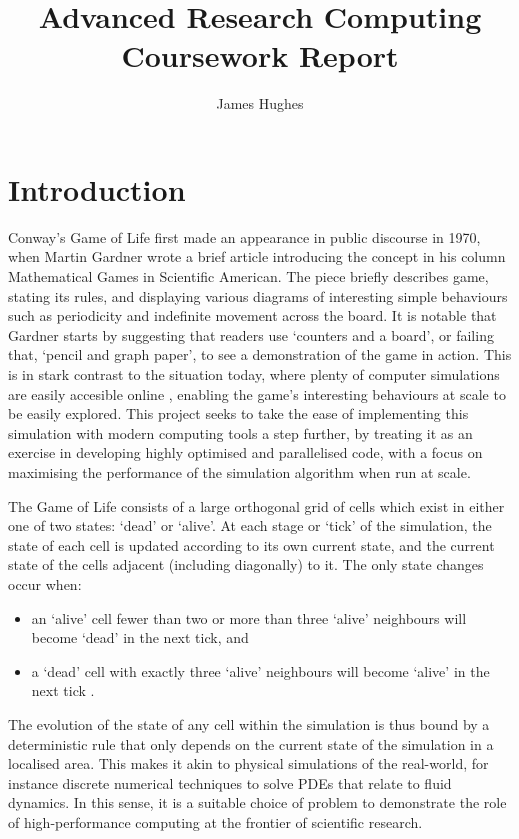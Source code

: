 \documentclass[12pt]{article}
\title{Advanced Research Computing Coursework Report}
\author{James Hughes}
\begin{document}
\maketitle

\newpage

\tableofcontents

\newpage

\section*{Introduction}

Conway's Game of Life first made an appearance in public discourse in 1970,
when Martin Gardner wrote a brief article introducing the concept in his column Mathematical Games in Scientific American\cite{gameoflife}.
The piece briefly describes game, stating its rules,
and displaying various diagrams of interesting simple behaviours such as periodicity and indefinite movement across the board.
It is notable that Gardner starts by suggesting that readers use `counters and a board', or failing that, `pencil and graph paper',
to see a demonstration of the game in action.
This is in stark contrast to the situation today, where plenty of computer simulations are easily accesible online \cite{playgameoflife},
enabling the game's interesting behaviours at scale to be easily explored.
This project seeks to take the ease of implementing this simulation with modern computing tools a step further,
by treating it as an exercise in developing highly optimised and parallelised code,
with a focus on maximising the performance of the simulation algorithm when run at scale.

The Game of Life consists of a large orthogonal grid of cells which exist in either one of two states: `dead' or `alive'.
At each stage or `tick' of the simulation, the state of each cell is updated according to its own current state,
and the current state of the cells adjacent (including diagonally) to it.
The only state changes occur when:

\begin{itemize}
    \item an `alive' cell fewer than two or more than three `alive' neighbours will become `dead' in the next tick, and
    \item a `dead' cell with exactly three `alive' neighbours will become `alive' in the next tick \cite{gameoflife}.
\end{itemize}

The evolution of the state of any cell within the simulation is thus bound by a deterministic rule that only depends on the current state of the simulation in a localised area.
This makes it akin to physical simulations of the real-world, for instance discrete numerical techniques to solve PDEs that relate to fluid dynamics.
In this sense, it is a suitable choice of problem to demonstrate the role of high-performance computing at the frontier of scientific research.
\end{document}
